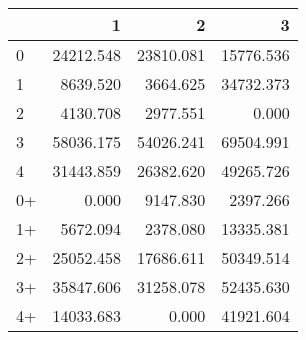 \begin{tabular}{lrrr}
\toprule
     &         1 &         2 &         3 \\
\midrule
 0   & \num{24212.548} & \num{23810.081} & \num{15776.536} \\
 1   &  \num{8639.520} &  \num{3664.625} & \num{34732.373} \\
 2   &  \num{4130.708} &  \num{2977.551} &     \num{0.000} \\
 3   & \num{58036.175} & \num{54026.241} & \num{69504.991} \\
 4   & \num{31443.859} & \num{26382.620} & \num{49265.726} \\
 0+  &     \num{0.000} &  \num{9147.830} &  \num{2397.266} \\
 1+  &  \num{5672.094} &  \num{2378.080} & \num{13335.381} \\
 2+  & \num{25052.458} & \num{17686.611} & \num{50349.514} \\
 3+  & \num{35847.606} & \num{31258.078} & \num{52435.630} \\
 4+  & \num{14033.683} &     \num{0.000} & \num{41921.604} \\
\bottomrule
\end{tabular}